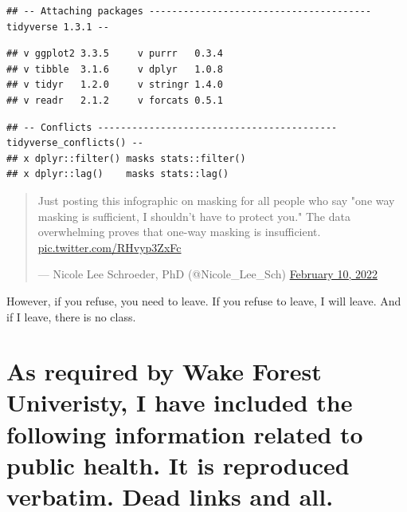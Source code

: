 \begin{verbatim}
## -- Attaching packages --------------------------------------- tidyverse 1.3.1 --
\end{verbatim}

\begin{verbatim}
## v ggplot2 3.3.5     v purrr   0.3.4
## v tibble  3.1.6     v dplyr   1.0.8
## v tidyr   1.2.0     v stringr 1.4.0
## v readr   2.1.2     v forcats 0.5.1
\end{verbatim}

\begin{verbatim}
## -- Conflicts ------------------------------------------ tidyverse_conflicts() --
## x dplyr::filter() masks stats::filter()
## x dplyr::lag()    masks stats::lag()
\end{verbatim}

\begin{quote}
Just posting this infographic on masking for all people who say "one
way masking is sufficient, I shouldn't have to protect you." The
data overwhelming proves that one-way masking is insufficient.
\href{https://t.co/RHvyp3ZxFc}{pic.twitter.com/RHvyp3ZxFc}

\begin{flushright}--- Nicole Lee Schroeder, PhD (@Nicole\_Lee\_Sch) \href{https://twitter.com/Nicole_Lee_Sch/status/1491793104348712965}{February 10,
2022}\end{flushright}
\end{quote}

However, if you refuse, you need to leave. If you refuse to leave, I will leave. And if I leave, there is no class.

\hypertarget{as-required-by-wake-forest-univeristy-i-have-included-the-following-information-related-to-public-health.-it-is-reproduced-verbatim.-dead-links-and-all.}{%
\section{As required by Wake Forest Univeristy, I have included the following information related to public health. It is reproduced verbatim. Dead links and all.}\label{as-required-by-wake-forest-univeristy-i-have-included-the-following-information-related-to-public-health.-it-is-reproduced-verbatim.-dead-links-and-all.}}

